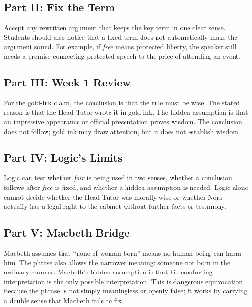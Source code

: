 \documentclass[12pt]{article}
\begin{document}
\subsection*{Part II: Fix the Term}
Accept any rewritten argument that keeps the key term in one clear sense. Students should also notice that a fixed term does not automatically make the argument sound. For example, if \textit{free} means protected liberty, the speaker still needs a premise connecting protected speech to the price of attending an event.

\subsection*{Part III: Week 1 Review}
For the gold-ink claim, the conclusion is that the rule must be wise. The stated reason is that the Head Tutor wrote it in gold ink. The hidden assumption is that an impressive appearance or official presentation proves wisdom. The conclusion does not follow; gold ink may draw attention, but it does not establish wisdom.

\subsection*{Part IV: Logic's Limits}
Logic can test whether \textit{fair} is being used in two senses, whether a conclusion follows after \textit{free} is fixed, and whether a hidden assumption is needed. Logic alone cannot decide whether the Head Tutor was morally wise or whether Nora actually has a legal right to the cabinet without further facts or testimony.

\subsection*{Part V: Macbeth Bridge}
Macbeth assumes that ``none of woman born'' means no human being can harm him. The phrase also allows the narrower meaning: someone not born in the ordinary manner. Macbeth's hidden assumption is that his comforting interpretation is the only possible interpretation. This is dangerous equivocation because the phrase is not simply meaningless or openly false; it works by carrying a double sense that Macbeth fails to fix.
\end{document}
